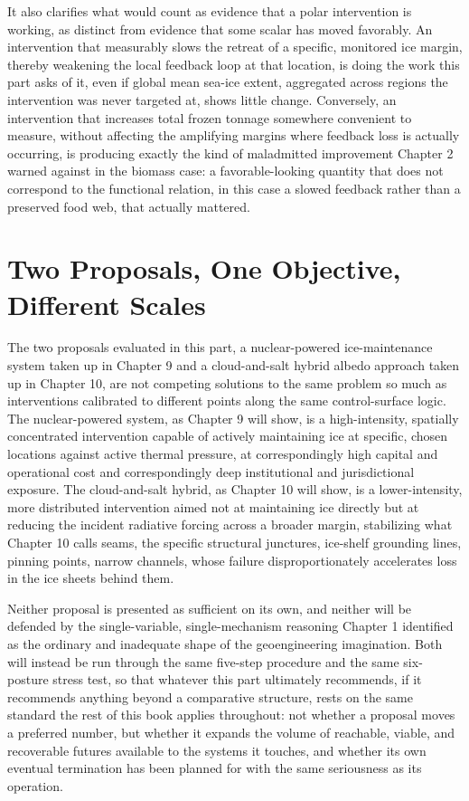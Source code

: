 \documentclass[11pt,oneside]{book}
\begin{document}
It also clarifies what would count as evidence that a polar intervention is working, as distinct from evidence that some scalar has moved favorably. An intervention that measurably slows the retreat of a specific, monitored ice margin, thereby weakening the local feedback loop at that location, is doing the work this part asks of it, even if global mean sea-ice extent, aggregated across regions the intervention was never targeted at, shows little change. Conversely, an intervention that increases total frozen tonnage somewhere convenient to measure, without affecting the amplifying margins where feedback loss is actually occurring, is producing exactly the kind of maladmitted improvement Chapter 2 warned against in the biomass case: a favorable-looking quantity that does not correspond to the functional relation, in this case a slowed feedback rather than a preserved food web, that actually mattered.

\section*{Two Proposals, One Objective, Different Scales}

The two proposals evaluated in this part, a nuclear-powered ice-maintenance system taken up in Chapter 9 and a cloud-and-salt hybrid albedo approach taken up in Chapter 10, are not competing solutions to the same problem so much as interventions calibrated to different points along the same control-surface logic. The nuclear-powered system, as Chapter 9 will show, is a high-intensity, spatially concentrated intervention capable of actively maintaining ice at specific, chosen locations against active thermal pressure, at correspondingly high capital and operational cost and correspondingly deep institutional and jurisdictional exposure. The cloud-and-salt hybrid, as Chapter 10 will show, is a lower-intensity, more distributed intervention aimed not at maintaining ice directly but at reducing the incident radiative forcing across a broader margin, stabilizing what Chapter 10 calls seams, the specific structural junctures, ice-shelf grounding lines, pinning points, narrow channels, whose failure disproportionately accelerates loss in the ice sheets behind them.

Neither proposal is presented as sufficient on its own, and neither will be defended by the single-variable, single-mechanism reasoning Chapter 1 identified as the ordinary and inadequate shape of the geoengineering imagination. Both will instead be run through the same five-step procedure and the same six-posture stress test, so that whatever this part ultimately recommends, if it recommends anything beyond a comparative structure, rests on the same standard the rest of this book applies throughout: not whether a proposal moves a preferred number, but whether it expands the volume of reachable, viable, and recoverable futures available to the systems it touches, and whether its own eventual termination has been planned for with the same seriousness as its operation.
\end{document}
